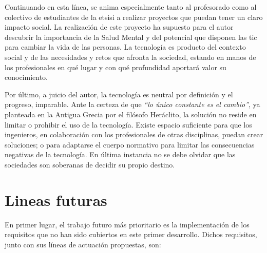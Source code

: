     Continuando en esta línea, se anima especialmente tanto al profesorado como al colectivo de estudiantes de la \gls{etsisi} a realizar proyectos que puedan tener un claro impacto social. La realización de este proyecto ha supuesto para el autor descubrir la importancia de la Salud Mental y del potencial que disponen las \gls{tic} para cambiar la vida de las personas. La tecnología es producto del contexto social y de las necesidades y retos que afronta la sociedad, estando en manos de los profesionales en qué lugar y con qué profundidad aportará valor su conocimiento. 
    
    Por último, a juicio del autor, la tecnología es neutral por definición y el progreso, imparable. Ante la certeza de que \textit{``lo único constante es el cambio''}, ya planteada en la Antigua Grecia por el filósofo Heráclito, la solución no reside en limitar o prohibir el uso de la tecnología. Existe espacio suficiente para que los ingenieros, en colaboración con los profesionales de otras disciplinas, puedan crear soluciones; o para adaptarse el cuerpo normativo para limitar las consecuencias negativas de la tecnología. En última instancia no se debe olvidar que las sociedades son soberanas de decidir su propio destino.
    
\section{Lineas futuras}
    \label{section:lineas_futuras}
    
    En primer lugar, el trabajo futuro más prioritario es la implementación de los requisitos que no han sido cubiertos en este primer desarrollo. Dichos requisitos, junto con sus líneas de actuación propuestas, son:

